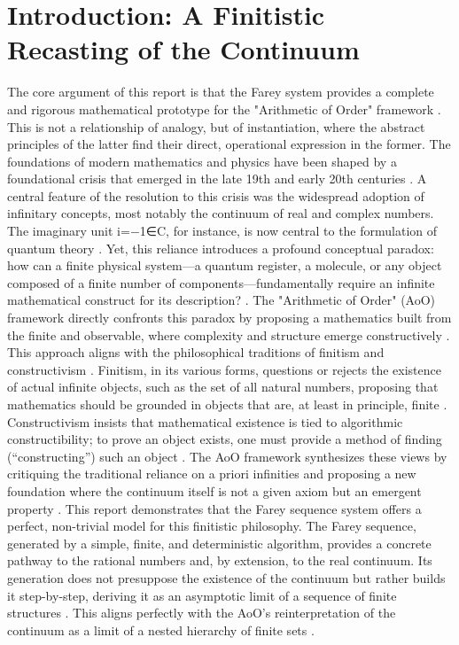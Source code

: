 \documentclass[12pt,a4paper]{article}
\theoremstyle{definition}
\theoremstyle{remark}
\begin{document}
\section{Introduction: A Finitistic Recasting of the Continuum}
The core argument of this report is that the Farey system provides a complete and rigorous mathematical prototype for the "Arithmetic of Order" framework \cite{ElKhettabi2025AoO}. This is not a relationship of analogy, but of instantiation, where the abstract principles of the latter find their direct, operational expression in the former.
The foundations of modern mathematics and physics have been shaped by a foundational crisis that emerged in the late 19th and early 20th centuries \cite{WikipediaFoundations}. A central feature of the resolution to this crisis was the widespread adoption of infinitary concepts, most notably the continuum of real and complex numbers. The imaginary unit i=−1​∈C, for instance, is now central to the formulation of quantum theory \cite{ElKhettabi2024HCN, ElKhettabi2025AoO}. Yet, this reliance introduces a profound conceptual paradox: how can a finite physical system—a quantum register, a molecule, or any object composed of a finite number of components—fundamentally require an infinite mathematical construct for its description? \cite{ElKhettabi2025AoO}.
The "Arithmetic of Order" (AoO) framework directly confronts this paradox by proposing a mathematics built from the finite and observable, where complexity and structure emerge constructively \cite{ElKhettabi2025AoO}. This approach aligns with the philosophical traditions of finitism and constructivism \cite{SEP_Finitism, SEP_Constructivism}. Finitism, in its various forms, questions or rejects the existence of actual infinite objects, such as the set of all natural numbers, proposing that mathematics should be grounded in objects that are, at least in principle, finite \cite{WikipediaFarey, SEP_Finitism}. Constructivism insists that mathematical existence is tied to algorithmic constructibility; to prove an object exists, one must provide a method of finding (“constructing”) such an object \cite{SEP_Constructivism, Zukin2016}. The AoO framework synthesizes these views by critiquing the traditional reliance on a priori infinities and proposing a new foundation where the continuum itself is not a given axiom but an emergent property \cite{ElKhettabi2025AoO}.
This report demonstrates that the Farey sequence system offers a perfect, non-trivial model for this finitistic philosophy. The Farey sequence, generated by a simple, finite, and deterministic algorithm, provides a concrete pathway to the rational numbers and, by extension, to the real continuum. Its generation does not presuppose the existence of the continuum but rather builds it step-by-step, deriving it as an asymptotic limit of a sequence of finite structures \cite{WikipediaFarey, Zukin2016}. This aligns perfectly with the AoO's reinterpretation of the continuum as a limit of a nested hierarchy of finite sets \cite{ElKhettabi2025AoO}.
\end{document}
